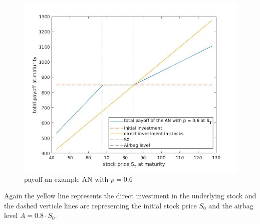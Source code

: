 \documentclass[11pt,oneside,a4paper]{article}
\begin{document}
	 \begin{figure}[H]
	 	\centering
	 	\includegraphics[width=0.6\linewidth]{payoff_AN.jpg}
	 	\caption{payoff an example AN with $ p = 0.6 $}
	 \end{figure}
	Again the yellow line represents the direct investment in the underlying stock and the dashed verticle lines are representing the initial stock price $ S_0 $ and the airbag level $ A = 0.8 \cdot S_0 $.
\end{document}
